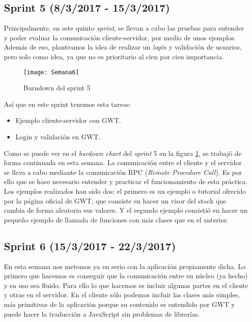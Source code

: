 \subsection{Sprint 5 (8/3/2017 - 15/3/2017)}

Principalmente, en este quinto \emph{sprint}, se llevan a cabo las pruebas para entender y poder evaluar la comunicación cliente-servidor, por medio de unos ejemplos. Además de eso, planteamos la idea de realizar un \emph{login} y validación de usuarios, pero solo como idea, ya que no es prioritario al cien por cien importancia.

\begin{figure}[h]
\centering
\texttt{[image: Semana6]}
\caption{Burndown del sprint 5}
\label{fig:A.4}
\end{figure}


Así que en este sprint tenemos esta tareas:

\begin{itemize}
\item Ejemplo cliente-servidor con GWT.
\item Login y validación en GWT.
\end{itemize}

Como se puede ver en el \emph{burdown chart} del \emph{sprint} 5  en la figura \ref{fig:A.4}, se trabajó de forma continuada en esta semana.
La comunicación entre el cliente y el servidor se lleva a cabo mediante la comunicación RPC (\emph{Remote Procedure Call}). Es por ello que se hace necesario entender y practicar el funcionamiento de esta práctica. Los ejemplos realizados han sido dos: el primero es un ejemplo o tutorial ofrecido por la página oficial de GWT, que consiste en hacer un visor del stock que cambia de forma aleatoria sus valores. Y el segundo ejemplo consistió en hacer un pequeño ejemplo de llamada de funciones con más clases que en el anterior.


\subsection{Sprint 6 (15/3/2017 - 22/3/2017)}

En esta semana nos metemos ya en serio con la aplicación propiamente dicha. Lo primero que hacemos es conseguir que la comunicación entre en núcleo (ya hecho) y su uso sea fluido. Para ello lo que hacemos es incluir algunas partes en el cliente y otras en el servidor. En el cliente sólo podemos incluir las clases más simples, más primitivas de la aplicación porque su contenido es entendido por GWT y puede hacer la traducción a JavaScript sin problemas de librerías.

